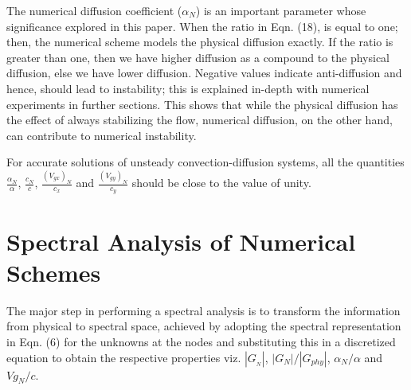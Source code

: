 \documentclass[showpacs,preprintnumbers,amsmath,amssymb]{revtex4-1} %
\begin{document}
The numerical diffusion coefficient ($\alpha_N$) is an important parameter whose significance explored in this paper. When the ratio in Eqn. (18), is equal to one; then, the numerical scheme models the physical diffusion exactly. If the ratio is greater than one, then we have higher diffusion as a compound to the physical diffusion, else we have lower diffusion. Negative values indicate anti-diffusion and hence, should lead to instability; this is explained in-depth with numerical experiments in further sections. This shows that while the physical diffusion has the effect of always stabilizing the flow, numerical diffusion, on the other hand, can contribute to numerical instability.

For accurate solutions of unsteady convection-diffusion systems, all the quantities $\frac{\alpha_N}{\alpha}$, $\frac{c_N}{c}$, $\frac{(V_{gx})_N}{c_x}$ and $\frac{(V_{gy})_N}{c_y}$ should be close to the value of unity.


\section{Spectral Analysis of Numerical Schemes}

The major step in performing a spectral analysis is to transform the information from physical to spectral space, achieved by adopting the spectral representation in Eqn. (6) for the unknowns at the nodes and substituting this in a discretized equation to obtain the respective properties viz. $|G_{_N}|$, $|G_N|/|G_{phy}|$, $\alpha_N/\alpha$ and $Vg_N/c$.
\end{document}
